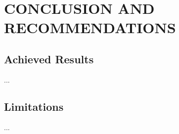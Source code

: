 %

\chapter{CONCLUSION AND RECOMMENDATIONS}
\label{chap:conclusion}

\section{Achieved Results}
...

\section{Limitations}
...

